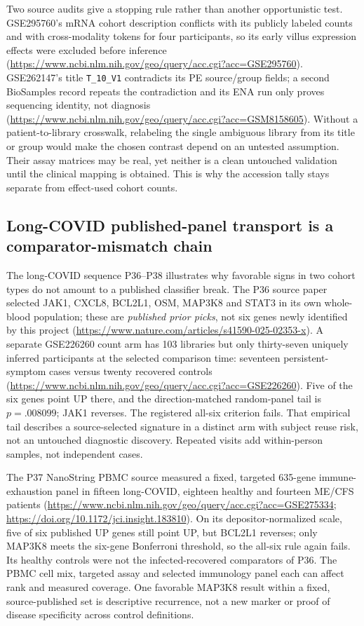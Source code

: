 \documentclass[11pt,a4paper]{article}
\begin{document}
Two source audits give a stopping rule rather than another opportunistic test. GSE295760's mRNA cohort description conflicts with its publicly labeled counts and with cross-modality tokens for four participants, so its early villus expression effects were excluded before inference (\url{https://www.ncbi.nlm.nih.gov/geo/query/acc.cgi?acc=GSE295760}). GSE262147's title \texttt{T\_10\_V1} contradicts its PE source/group fields; a second BioSamples record repeats the contradiction and its ENA run only proves sequencing identity, not diagnosis (\url{https://www.ncbi.nlm.nih.gov/geo/query/acc.cgi?acc=GSM8158605}). Without a patient-to-library crosswalk, relabeling the single ambiguous library from its title or group would make the chosen contrast depend on an untested assumption. Their assay matrices may be real, yet neither is a clean untouched validation until the clinical mapping is obtained. This is why the accession tally stays separate from effect-used cohort counts.

\subsection{Long-COVID published-panel transport is a comparator-mismatch chain}
The long-COVID sequence P36--P38 illustrates why favorable signs in two cohort types do not amount to a published classifier break. The P36 source paper selected JAK1, CXCL8, BCL2L1, OSM, MAP3K8 and STAT3 in its own whole-blood population; these are \emph{published prior picks}, not six genes newly identified by this project (\url{https://www.nature.com/articles/s41590-025-02353-x}). A separate GSE226260 count arm has 103 libraries but only thirty-seven uniquely inferred participants at the selected comparison time: seventeen persistent-symptom cases versus twenty recovered controls (\url{https://www.ncbi.nlm.nih.gov/geo/query/acc.cgi?acc=GSE226260}). Five of the six genes point UP there, and the direction-matched random-panel tail is $p=.008099$; JAK1 reverses. The registered all-six criterion fails. That empirical tail describes a source-selected signature in a distinct arm with subject reuse risk, not an untouched diagnostic discovery. Repeated visits add within-person samples, not independent cases.

The P37 NanoString PBMC source measured a fixed, targeted 635-gene immune-exhaustion panel in fifteen long-COVID, eighteen healthy and fourteen ME/CFS patients (\url{https://www.ncbi.nlm.nih.gov/geo/query/acc.cgi?acc=GSE275334}; \url{https://doi.org/10.1172/jci.insight.183810}). On its depositor-normalized scale, five of six published UP genes still point UP, but BCL2L1 reverses; only MAP3K8 meets the six-gene Bonferroni threshold, so the all-six rule again fails. Its healthy controls were not the infected-recovered comparators of P36. The PBMC cell mix, targeted assay and selected immunology panel each can affect rank and measured coverage. One favorable MAP3K8 result within a fixed, source-published set is descriptive recurrence, not a new marker or proof of disease specificity across control definitions.
\end{document}
